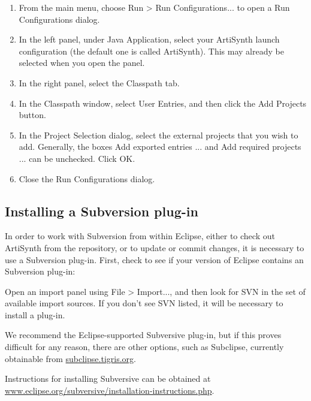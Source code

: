 \begin{enumerate}

\item From the main menu, choose {\sf Run > Run Configurations...}
to open a {\sf Run Configurations} dialog.

\item In the left panel, under {\sf Java Application}, select your
ArtiSynth launch configuration (the default one is called {\sf
ArtiSynth}). This may already be selected when you open the panel.

\item In the right panel, select the {\sf Classpath} tab.

\item In the {\sf Classpath} window, select {\sf User Entries},
and then click the {\sf Add Projects} button.

\item In the {\sf Project Selection} dialog, select the external
projects that you wish to add. Generally, the boxes
{\sf Add exported entries ...} and {\sf Add required projects ...}
can be unchecked. Click {\sf OK}.

\item Close the {\sf Run Configurations} dialog.

\end{enumerate}

\subsection{Installing a Subversion plug-in}
\label{SubversionPlugIn}

In order to work with Subversion from within Eclipse, either to check
out ArtiSynth from the repository, or to update or commit changes, it
is necessary to use a Subversion plug-in. First, check to see if your
version of Eclipse contains an Subversion plug-in:

Open an import panel using {\sf File > Import...}, and then look for
{\sf SVN} in the set of available import sources. If you don't see SVN
listed, it will be necessary to install a plug-in.

We recommend the Eclipse-supported Subversive plug-in, but if this
proves difficult for any reason, there are other options, such as
Subclipse, currently obtainable from
\href{http://subclipse.tigris.org/servlets/ProjectProcess?pageID=p4wYuA}%
{subclipse.tigris.org}.

Instructions for installing Subversive can be obtained at
\href{http://www.eclipse.org/subversive/installation-instructions.php}%
{www.eclipse.org/subversive/installation-instructions.php}.

